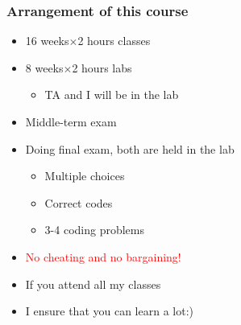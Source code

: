 \begin{frame}
	\frametitle{Arrangement of this course}
\begin{itemize}
	\item {16 weeks${\times}$2 hours classes}
	\item {8 weeks${\times}$2 hours labs}
	\begin{itemize}
			\item {TA and I will be in the lab}
	\end{itemize}
	\item {Middle-term exam}
	\item {Doing final exam, both are held in the lab}
	\begin{itemize}
		\item {Multiple choices}	
		\item {Correct codes}
		\item {3-4 coding problems}
	\end{itemize}
	\item {\textcolor{red}{No cheating and no bargaining!}}
	\item {If you attend all my classes}
	\item {I ensure that you can learn a lot:)}
\end{itemize}
\end{frame}

%
%

%

